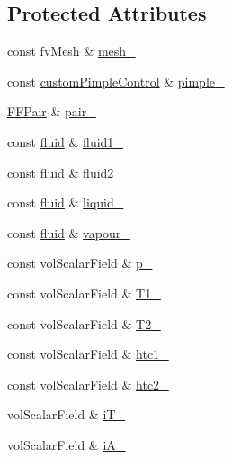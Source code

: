 \subsection*{Protected Attributes}
\begin{DoxyCompactItemize}
\item 
const fv\+Mesh \& \hyperlink{classFoam_1_1phaseChangeModel_a23edeeeecebcef11921a33dd5d990570}{mesh\+\_\+}
\item 
const \hyperlink{classFoam_1_1customPimpleControl}{custom\+Pimple\+Control} \& \hyperlink{classFoam_1_1phaseChangeModel_a06f54c6f34cf95f4f0b3d573a196e0c5}{pimple\+\_\+}
\item 
\hyperlink{classFoam_1_1FFPair}{F\+F\+Pair} \& \hyperlink{classFoam_1_1phaseChangeModel_a34eaebd15a485f0ebfb0d0093191b903}{pair\+\_\+}
\item 
const \hyperlink{classFoam_1_1fluid}{fluid} \& \hyperlink{classFoam_1_1phaseChangeModel_a5e2d96f5c8eaf3d2ba2fd36db82b8e8b}{fluid1\+\_\+}
\item 
const \hyperlink{classFoam_1_1fluid}{fluid} \& \hyperlink{classFoam_1_1phaseChangeModel_a10350fa01c5980453030c19e26a2253f}{fluid2\+\_\+}
\item 
const \hyperlink{classFoam_1_1fluid}{fluid} \& \hyperlink{classFoam_1_1phaseChangeModel_a908415555f3c334379400a3eb5759639}{liquid\+\_\+}
\item 
const \hyperlink{classFoam_1_1fluid}{fluid} \& \hyperlink{classFoam_1_1phaseChangeModel_a2675e35060f71c22823e4a0b3c816dad}{vapour\+\_\+}
\item 
const vol\+Scalar\+Field \& \hyperlink{classFoam_1_1phaseChangeModel_a4c9ce31e482786bbeeed352570fd8d09}{p\+\_\+}
\item 
const vol\+Scalar\+Field \& \hyperlink{classFoam_1_1phaseChangeModel_a60ade7bb6e9a5c05333e335b4cfee3b8}{T1\+\_\+}
\item 
const vol\+Scalar\+Field \& \hyperlink{classFoam_1_1phaseChangeModel_aa613d70e11e45888cd30054d51ba8557}{T2\+\_\+}
\item 
const vol\+Scalar\+Field \& \hyperlink{classFoam_1_1phaseChangeModel_a37d95d641ff7ef8baac9580273f0cc18}{htc1\+\_\+}
\item 
const vol\+Scalar\+Field \& \hyperlink{classFoam_1_1phaseChangeModel_a0ba63bf91e29253c57fbab3587bf4aad}{htc2\+\_\+}
\item 
vol\+Scalar\+Field \& \hyperlink{classFoam_1_1phaseChangeModel_ac30ca4a3968c5d5a58b653dab6fcafc8}{i\+T\+\_\+}
\item 
vol\+Scalar\+Field \& \hyperlink{classFoam_1_1phaseChangeModel_a97ae6ee1949b5d7f65cb435f9b218737}{i\+A\+\_\+}

\end{DoxyCompactItemize}
